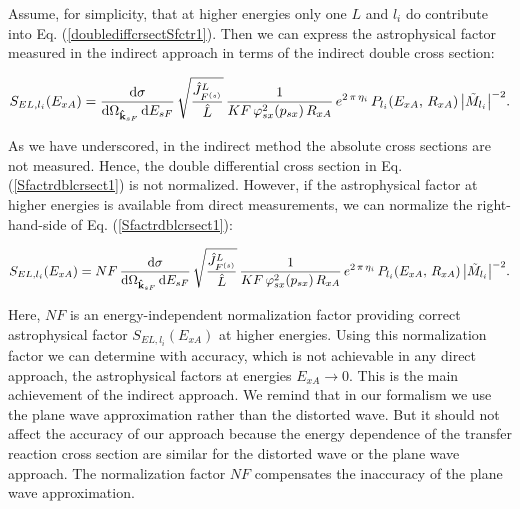 \documentclass[prl,unsortedaddress,groupedaddress,twocolumn,amsmath,amsfonts,amssymb,showpacs,floatfix,nofootinbib]{revtex4}
\begin{document}
Assume, for simplicity, that at higher energies only one $L$ and $l_{i}$ do contribute into Eq. (\ref{doublediffcrsectSfctr1}).
Then we can express the astrophysical factor measured in the indirect approach in terms of the indirect double cross section:
\begin{widetext}
\begin{align}
 S_{EL,l_{i}}(E_{xA})= \frac{ {\rm d}\sigma}{  {\rm d}{\Omega}_{  {\rm{\bf {\hat k}}}_{sF} }\, {\rm d}{E_{sF}} }\,\sqrt{\frac{ {\hat J}_{F^{(s)}}^{L} }{ {\hat L}}}  \,\frac{1}{KF\,\varphi_{sx}^{2}(p_{sx})\,R_{xA}}\,e^{2\,\pi\,\eta_{i}}\,P_{l_{i}}(E_{xA},\,R_{xA})\,
\big| {\tilde M}_{l_{i}} \big|^{-2}.
\label{Sfactrdblcrsect1}
\end{align}
\end{widetext}
As we have underscored, in the indirect method the absolute cross sections are not measured. 
Hence, the double differential cross section in Eq. (\ref{Sfactrdblcrsect1}) is not normalized.
However, if the astrophysical factor at higher energies is available from direct measurements, we can normalize the right-hand-side of Eq. (\ref{Sfactrdblcrsect1}):
\begin{widetext}
\begin{align}
 S_{EL,l_{i}}(E_{xA})= NF\,\frac{ {\rm d}\sigma}{  {\rm d}{\Omega}_{  {\rm{\bf {\hat k}}}_{sF} }\, {\rm d}{E_{sF}} }\,\sqrt{\frac{ {\hat J}_{F^{(s)}}^{L} }{ {\hat L}}}  \,\frac{1}{KF\,\varphi_{sx}^{2}(p_{sx})\,R_{xA}}\,e^{2\,\pi\,\eta_{i}}\,P_{l_{i}}(E_{xA},\,R_{xA})\,
\big| {\tilde M}_{l_{i}} \big|^{-2}.
\label{Sfactrdblcrsect11}
\end{align}
\end{widetext}
Here, $NF$ is an energy-independent normalization factor providing correct astrophysical factor $S_{EL,l_{i}}(E_{xA})$ at higher energies. 
Using this normalization factor we can determine with accuracy, which is not achievable in any direct approach, the astrophysical factors at energies $E_{xA} \to 0$. This is the main achievement of the indirect approach.
We remind that in our formalism we use the plane wave approximation rather than the distorted wave. But it should not affect the accuracy of our approach because the energy dependence of the transfer reaction cross section are similar for the distorted wave or the plane wave approach. The normalization factor
$NF$ compensates the inaccuracy of the plane wave approximation.
\end{document}

